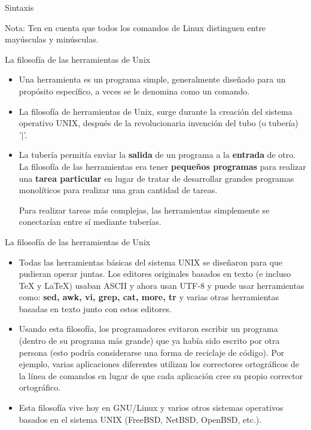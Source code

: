 \begin{frame}[c]{Sintaxis}
  \begin{alertblock}{Nota:}
    Ten en cuenta que todos los comandos de Linux distinguen entre mayúsculas y minúsculas.
  \end{alertblock}
\end{frame}

\begin{frame}[c]{La filosofía de las herramientas de Unix}
  \begin{itemize}
    \item Una herramienta es un programa simple, generalmente diseñado para un
      propósito específico, a veces se le denomina como un comando.

    \pausa
    \item La filosofía de herramientas de Unix, surge durante la creación del
      sistema operativo UNIX, después de la revolucionaria invención del
      tubo (o tubería) '|'.

    \pausa
    \item La tubería permitía enviar la \textbf{salida} de un programa a la
      \textbf{entrada} de otro. La filosofía de las herramientas era tener
      \textbf{pequeños programas} para realizar una \textbf{tarea
      particular} en lugar de tratar de desarrollar grandes
      programas monolíticos para realizar una gran cantidad de tareas.

      Para realizar tareas más complejas, las herramientas simplemente se
      conectarían entre sí mediante tuberías.
  \end{itemize}
\end{frame}

\begin{frame}[c]{La filosofía de las herramientas de Unix}
  \begin{itemize}
    \item Todas las herramientas básicas del sistema UNIX se diseñaron para
      que pudieran operar juntas. Los editores originales basados en texto (e
      incluso TeX y LaTeX) usaban ASCII y ahora usan UTF-8 y puede usar
      herramientas como: \textbf{sed, awk, vi, grep, cat, more, tr} y
      varias otras herramientas basadas en texto junto con estos editores.

    \pausa
    \item Usando esta filosofía, los programadores evitaron escribir un
      programa (dentro de su programa más grande) que ya había sido escrito
      por otra persona (esto podría considerarse una forma de reciclaje de
      código). Por ejemplo, varias aplicaciones diferentes utilizan los
      correctores ortográficos de la línea de comandos en lugar de que cada
      aplicación cree su propio corrector ortográfico.

    \pausa
    \item Esta filosofía vive hoy en GNU/Linux y varios otros sistemas
      operativos basados en el sistema UNIX (FreeBSD, NetBSD, OpenBSD, etc.).
  \end{itemize}
\end{frame}

